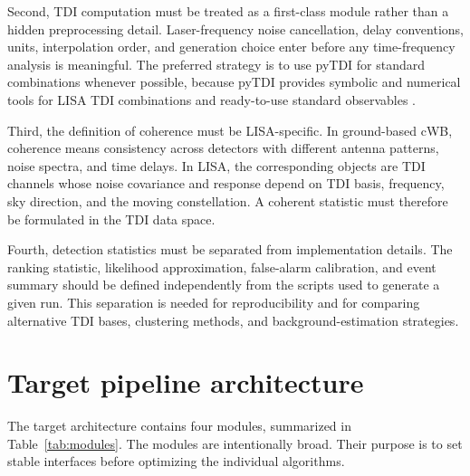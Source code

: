 \documentclass[%
 reprint,
 amsmath,amssymb,
 aps,
 prd,
]{revtex4-2}
\begin{document}
Second, TDI computation must be treated as a first-class module rather than a hidden preprocessing detail.  Laser-frequency noise cancellation, delay conventions, units, interpolation order, and generation choice enter before any time-frequency analysis is meaningful.  The preferred strategy is to use pyTDI for standard combinations whenever possible, because pyTDI provides symbolic and numerical tools for LISA TDI combinations and ready-to-use standard observables \cite{PyTDI}.

Third, the definition of coherence must be LISA-specific.  In ground-based cWB, coherence means consistency across detectors with different antenna patterns, noise spectra, and time delays.  In LISA, the corresponding objects are TDI channels whose noise covariance and response depend on TDI basis, frequency, sky direction, and the moving constellation.  A coherent statistic must therefore be formulated in the TDI data space.

Fourth, detection statistics must be separated from implementation details.  The ranking statistic, likelihood approximation, false-alarm calibration, and event summary should be defined independently from the scripts used to generate a given run.  This separation is needed for reproducibility and for comparing alternative TDI bases, clustering methods, and background-estimation strategies.

\section{Target pipeline architecture}
\label{sec:architecture}

The target architecture contains four modules, summarized in Table~\ref{tab:modules}.  The modules are intentionally broad.  Their purpose is to set stable interfaces before optimizing the individual algorithms.
\end{document}
